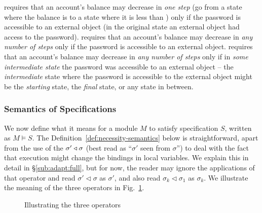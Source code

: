 \noindent
\SRobustNextAcc  requires that an account's balance may decrease in \emph{one step} (go from a state where the balance is 
to a state where it is less than ) only if the password is accessible to an external object (in the original state an external object had access to the password).
\SRobustIfAcc  requires that an account's balance may decrease in \emph{any number of steps}    only if the password is accessible to an external object.
\SRobustThroughAcc requires that an account's balance may decrease in \emph{any number of steps}    only if in \emph{some intermediate state} the password was accessible to an external object --  the   \emph{intermediate} state  where the password is accessible to the external object might be the \emph{starting}  
state, the \emph{final} state, or any state in between.

 


\subsubsection{Semantics of \Nec Specifications}
We now  define what it means for  a module  $M$ to satisfy specification  $S$, written as $M \vDash S$. The
 Definition~\ref{def:necessity-semantics} below is straightforward, apart from  
the use of the $\sigma' \triangleleft \sigma$  (best read as ``$\sigma'$ seen
from $\sigma$'')
to deal with the fact that execution might  change the bindings in local variables.
We explain this in detail in   \S \ref{sub:adapt:full}, but for now, the reader may ignore the applications of that operator and
read $\sigma' \triangleleft \sigma$ as $\sigma'$,
and also read ${\sigma_k \triangleleft \sigma_1}$ as  $\sigma_k$.
We illustrate the meaning of the three operators in 
Fig.~\ref{fig:Operators}.

%
%
\begin{figure}[htbp]
\resizebox{\textwidth}{!}{

}
\caption{Illustrating the three \Nec operators}
\label{fig:Operators}
\end{figure}





